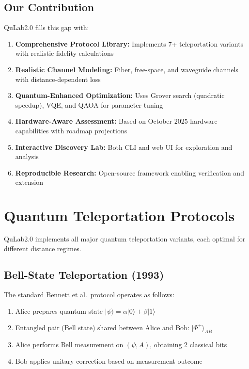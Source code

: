 \documentclass[11pt,a4paper]{article}
\begin{document}
\subsection{Our Contribution}

QuLab2.0 fills this gap with:

\begin{enumerate}
    \item \textbf{Comprehensive Protocol Library:} Implements 7+ teleportation variants with realistic fidelity calculations
    \item \textbf{Realistic Channel Modeling:} Fiber, free-space, and waveguide channels with distance-dependent loss
    \item \textbf{Quantum-Enhanced Optimization:} Uses Grover search (quadratic speedup), VQE, and QAOA for parameter tuning
    \item \textbf{Hardware-Aware Assessment:} Based on October 2025 hardware capabilities with roadmap projections
    \item \textbf{Interactive Discovery Lab:} Both CLI and web UI for exploration and analysis
    \item \textbf{Reproducible Research:} Open-source framework enabling verification and extension
\end{enumerate}

\section{Quantum Teleportation Protocols}

QuLab2.0 implements all major quantum teleportation variants, each optimal for different distance regimes.

\subsection{Bell-State Teleportation (1993)}

The standard Bennett et al.~protocol operates as follows:
\begin{enumerate}
    \item Alice prepares quantum state $|\psi\rangle = \alpha|0\rangle + \beta|1\rangle$
    \item Entangled pair (Bell state) shared between Alice and Bob: $|\Phi^+\rangle_{AB}$
    \item Alice performs Bell measurement on $(\psi, A)$, obtaining 2 classical bits
    \item Bob applies unitary correction based on measurement outcome
\end{enumerate}
\end{document}
